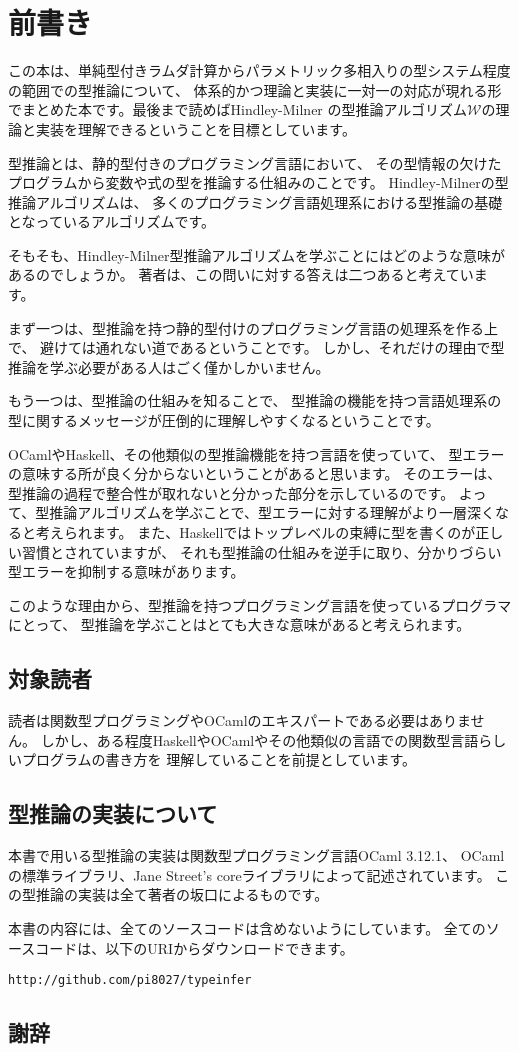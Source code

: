 
\chapter*{前書き}

この本は、単純型付きラムダ計算からパラメトリック多相入りの型システム程度の範囲での型推論について、
体系的かつ理論と実装に一対一の対応が現れる形でまとめた本です。最後まで読めばHindley-Milner
の型推論アルゴリズム$\mathcal W$の理論と実装を理解できるということを目標としています。

型推論とは、静的型付きのプログラミング言語において、
その型情報の欠けたプログラムから変数や式の型を推論する仕組みのことです。
Hindley-Milnerの型推論アルゴリズムは、
多くのプログラミング言語処理系における型推論の基礎となっているアルゴリズムです。

そもそも、Hindley-Milner型推論アルゴリズムを学ぶことにはどのような意味があるのでしょうか。
著者は、この問いに対する答えは二つあると考えています。

まず一つは、型推論を持つ静的型付けのプログラミング言語の処理系を作る上で、
避けては通れない道であるということです。
しかし、それだけの理由で型推論を学ぶ必要がある人はごく僅かしかいません。

もう一つは、型推論の仕組みを知ることで、
型推論の機能を持つ言語処理系の型に関するメッセージが圧倒的に理解しやすくなるということです。

OCamlやHaskell、その他類似の型推論機能を持つ言語を使っていて、
型エラーの意味する所が良く分からないということがあると思います。
そのエラーは、型推論の過程で整合性が取れないと分かった部分を示しているのです。
よって、型推論アルゴリズムを学ぶことで、型エラーに対する理解がより一層深くなると考えられます。
また、Haskellではトップレベルの束縛に型を書くのが正しい習慣とされていますが、
それも型推論の仕組みを逆手に取り、分かりづらい型エラーを抑制する意味があります。

このような理由から、型推論を持つプログラミング言語を使っているプログラマにとって、
型推論を学ぶことはとても大きな意味があると考えられます。

\section*{対象読者}

読者は関数型プログラミングやOCamlのエキスパートである必要はありません。
しかし、ある程度HaskellやOCamlやその他類似の言語での関数型言語らしいプログラムの書き方を
理解していることを前提としています。

\section*{型推論の実装について}

本書で用いる型推論の実装は関数型プログラミング言語OCaml 3.12.1、
OCamlの標準ライブラリ、Jane Street's coreライブラリによって記述されています。
この型推論の実装は全て著者の坂口によるものです。

本書の内容には、全てのソースコードは含めないようにしています。
全てのソースコードは、以下のURIからダウンロードできます。

\texttt{http://github.com/pi8027/typeinfer}

\section*{謝辞}




